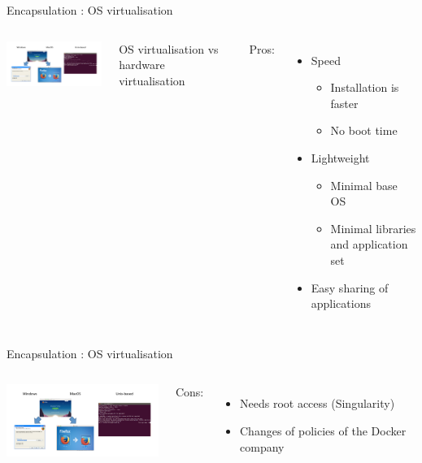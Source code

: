 \begin{frame}{Encapsulation : OS virtualisation}
\begin{columns}

\includegraphics[width=6cm]{02_encapsulation/figures/install_firefox.pdf}

OS virtualisation vs hardware virtualisation

Pros:
\begin{itemize}
  \item Speed 
  \begin{itemize}
    \item Installation is faster
    \item No boot time
  \end{itemize}
  \item Lightweight
  \begin{itemize}
    \item Minimal base OS
    \item Minimal libraries and application set
  \end{itemize}
  \item Easy sharing of applications
\end{itemize}

\end{columns}
\end{frame}

\begin{frame}{Encapsulation : OS virtualisation}
\begin{columns}

\includegraphics[width=6cm]{02_encapsulation/figures/install_firefox.pdf}


Cons:
\begin{itemize}
  \item Needs root access (Singularity)
  \item Changes of policies of the Docker company
\end{itemize}

\end{columns}
\end{frame}


